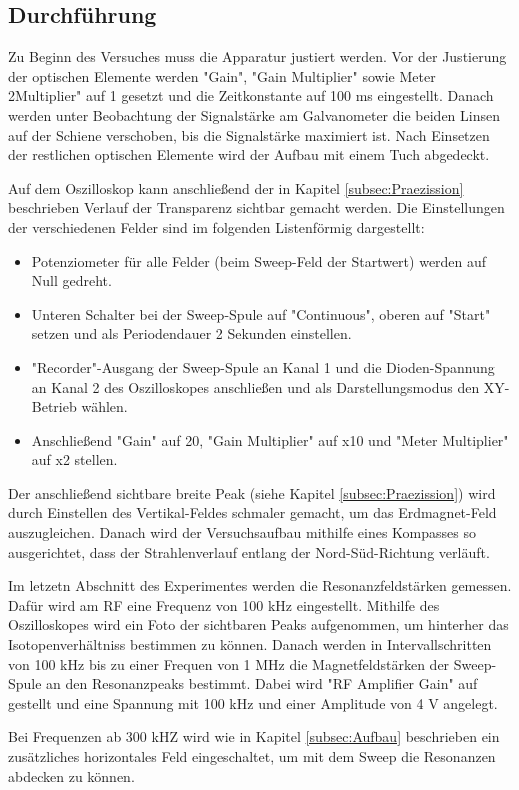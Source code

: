 \subsection{Durchführung}
\label{subsec:Durchführung}

Zu Beginn des Versuches muss die Apparatur justiert werden. Vor der Justierung
der optischen Elemente werden "Gain", "Gain Multiplier" sowie Meter 2Multiplier"
auf 1 gesetzt und die Zeitkonstante auf 100 ms eingestellt.
Danach werden unter Beobachtung der
Signalstärke am Galvanometer die beiden Linsen auf der Schiene verschoben, bis
die Signalstärke maximiert ist. Nach Einsetzen der restlichen optischen Elemente
wird der Aufbau mit einem Tuch abgedeckt.

Auf dem Oszilloskop kann anschließend der in Kapitel
\ref{subsec:Praezission} beschrieben Verlauf der Transparenz sichtbar gemacht
werden. Die Einstellungen der verschiedenen Felder sind im folgenden Listenförmig
dargestellt:

\begin{itemize}
  \item Potenziometer für alle Felder (beim Sweep-Feld der Startwert) werden auf
  Null gedreht.
  \item Unteren Schalter bei der Sweep-Spule auf "Continuous", oberen auf "Start"
  setzen und als Periodendauer 2 Sekunden einstellen.
  \item  "Recorder"-Ausgang der Sweep-Spule an Kanal 1 und die Dioden-Spannung an
  Kanal 2 des Oszilloskopes anschließen und als Darstellungsmodus den XY-Betrieb
  wählen.
  \item Anschließend "Gain" auf 20, "Gain Multiplier" auf x10 und "Meter Multiplier"
  auf x2 stellen.
\end{itemize}

Der anschließend sichtbare breite Peak (siehe Kapitel \ref{subsec:Praezission}) wird
durch Einstellen des Vertikal-Feldes schmaler gemacht, um das Erdmagnet-Feld
auszugleichen. Danach wird der
Versuchsaufbau mithilfe eines Kompasses so ausgerichtet, dass der Strahlenverlauf
entlang der Nord-Süd-Richtung verläuft.

Im letzetn Abschnitt des Experimentes werden die Resonanzfeldstärken gemessen.
Dafür wird am RF eine Frequenz von 100 kHz eingestellt. Mithilfe des Oszilloskopes
wird ein Foto der sichtbaren Peaks aufgenommen, um hinterher das Isotopenverhältniss
bestimmen zu können. Danach werden in Intervallschritten von 100 kHz bis zu einer
Frequen von 1 MHz die Magnetfeldstärken der Sweep-Spule an den Resonanzpeaks bestimmt.
Dabei wird "RF Amplifier Gain" auf gestellt und eine Spannung mit 100 kHz und einer
Amplitude von 4 V angelegt.

Bei Frequenzen ab 300 kHZ wird wie in Kapitel \ref{subsec:Aufbau} beschrieben
ein zusätzliches horizontales Feld eingeschaltet, um mit dem Sweep die Resonanzen
abdecken zu können.
